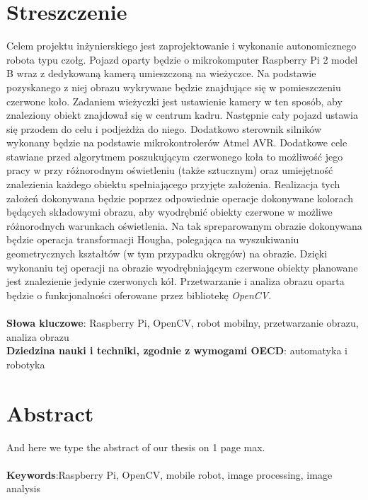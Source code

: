 
\chapter*{Streszczenie}
Celem projektu inżynierskiego jest zaprojektowanie i wykonanie autonomicznego robota typu czołg. Pojazd oparty będzie o mikrokomputer Raspberry Pi 2 model B wraz z dedykowaną kamerą umieszczoną na wieżyczce. Na podstawie pozyskanego z niej obrazu wykrywane będzie znajdujące się w  pomieszczeniu czerwone koło. Zadaniem wieżyczki jest ustawienie kamery w ten sposób, aby znaleziony obiekt znajdował się w centrum kadru. Następnie cały pojazd ustawia się przodem do celu i podjeżdża do niego. Dodatkowo sterownik silników wykonany będzie na podstawie mikrokontrolerów Atmel AVR.
Dodatkowe cele stawiane przed algorytmem poszukującym czerwonego koła to możliwość jego pracy w przy różnorodnym oświetleniu (także sztucznym) oraz umiejętność znalezienia każdego obiektu spełniającego przyjęte założenia. Realizacja tych założeń dokonywana będzie poprzez odpowiednie operacje dokonywane kolorach będących składowymi obrazu, aby wyodrębnić obiekty czerwone w możliwe różnorodnych warunkach oświetlenia. Na tak spreparowanym obrazie dokonywana będzie operacja transformacji Hougha, polegająca na wyszukiwaniu geometrycznych kształtów (w tym przypadku okręgów) na obrazie. Dzięki wykonaniu tej operacji na obrazie wyodrębniającym czerwone obiekty planowane jest znalezienie jedynie czerwonych kół. Przetwarzanie i analiza obrazu oparta będzie o funkcjonalności oferowane przez bibliotekę \textit{OpenCV}.
\\\\
\noindent
\textbf{Słowa kluczowe}: Raspberry Pi, OpenCV, robot mobilny, przetwarzanie obrazu, analiza obrazu
\\

\noindent
\textbf{Dziedzina nauki i techniki, zgodnie z wymogami OECD}: automatyka i robotyka
\chapter*{Abstract}
And here we type the abstract of our thesis on 1 page max.
\\\\
\noindent
\textbf{Keywords}:Raspberry Pi, OpenCV, mobile robot, image processing, image analysis